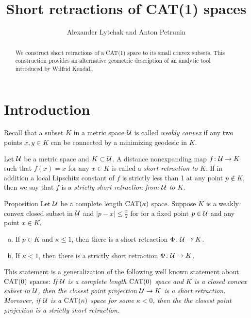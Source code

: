 \documentclass[oneside,a4paper, 12pt]{article}
\begin{document}
\title{Short retractions of CAT(1) spaces}
\author{Alexander Lytchak and Anton Petrunin}
\date{}
\maketitle

\begin{abstract}
We construct short retractions of a CAT(1) space to its small convex subsets.
This construction provides an alternative geometric description of an analytic tool introduced by Wilfrid Kendall. 
\end{abstract}


\section{Introduction}

Recall that a  subset $K$ in a metric space ${\mathcal{U}}$ is called \emph{weakly convex} if any two points $x,y\in K$ can be connected by a minimizing geodesic in $K$.

Let ${\mathcal{U}}$ be a metric space and $K\subset {\mathcal{U}}$.
A distance nonexpanding map $f\colon{\mathcal{U}}\to K$ such that $f(x)=x$ for any $x\in K$ is called a \emph{short retraction to $K$}.
If in addition a local Lipschitz constant of $f$ is strictly less than 1 at any point $p\notin K$, 
then we say that $f$ is a \emph{strictly short retraction from ${\mathcal{U}}$ to $K$}.

\begin{thm}{Proposition}\label{thm:retraction:Phi}
Let $\mathcal{U}$ be a complete length $\mathrm{CAT}(\kappa)$ space.
Suppose $K$ is a weakly convex closed subset in $\mathcal{U}$ and $|p-x|\le \tfrac\pi2$ for for a fixed point $p\in \mathcal{U}$ and any point $x\in K$.


\begin{enumerate}[(a)]
 \item If $p\in K$ and $\kappa\le 1$, then there is a short retraction 
$\Phi\colon\mathcal{U}\to K$.
\item If $\kappa<1$, then there is a strictly short retraction 
$\Phi\colon\mathcal{U}\to K$.
\end{enumerate}
\end{thm}

This statement is a generalization of the following well known statement about $\mathrm{CAT}(0)$ spaces:
\emph{If ${\mathcal{U}}$ is a complete length $\mathrm{CAT}(0)$ space and $K$ is a closed convex subset in ${\mathcal{U}}$,
then the closest point projection ${\mathcal{U}}\to K$ is a short retraction.
Moreover, if $\mathcal{U}$ is a $\mathrm{CAT}(\kappa)$ space for some $\kappa<0$, then the the closest point projection is a strictly short retraction}.
\end{document}
